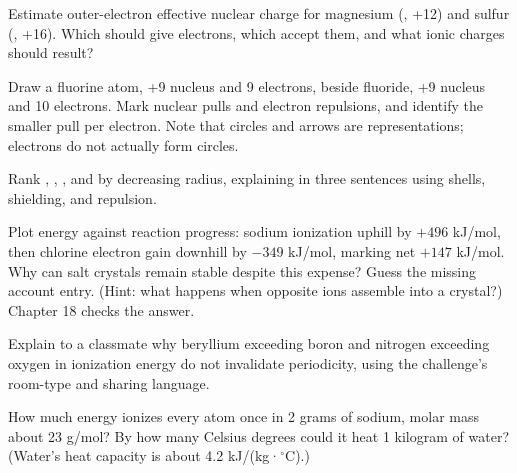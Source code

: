 \begin{sikaoti}
\item Estimate outer-electron effective nuclear charge for magnesium (, +12) and sulfur (, +16). Which should give electrons, which accept them, and what ionic charges should result?
\item Draw a fluorine atom, +9 nucleus and 9 electrons, beside fluoride, +9 nucleus and 10 electrons. Mark nuclear pulls and electron repulsions, and identify the smaller pull per electron. Note that circles and arrows are representations; electrons do not actually form circles.
\item Rank , , , and  by decreasing radius, explaining in three sentences using shells, shielding, and repulsion.
\item Plot energy against reaction progress: sodium ionization uphill by $+496$ kJ/mol, then chlorine electron gain downhill by $-349$ kJ/mol, marking net $+147$ kJ/mol. Why can salt crystals remain stable despite this expense? Guess the missing account entry. (Hint: what happens when opposite ions assemble into a crystal?) Chapter 18 checks the answer.
\item Explain to a classmate why beryllium exceeding boron and nitrogen exceeding oxygen in ionization energy do not invalidate periodicity, using the challenge's room-type and sharing language.
\item How much energy ionizes every atom once in 2 grams of sodium, molar mass about 23 g/mol? By how many Celsius degrees could it heat 1 kilogram of water? (Water's heat capacity is about 4.2 kJ/(kg·$^{\circ}$C).)
\end{sikaoti}
